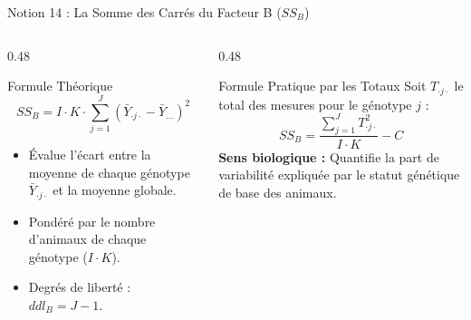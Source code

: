 \documentclass[aspectratio=169,10pt]{beamer}
\begin{document}
\begin{frame}{Notion 14 : La Somme des Carrés du Facteur B ($SS_B$)}
  \begin{columns}[onlytextwidth, T]
    \begin{column}{0.48\linewidth}
      \begin{conceptbox}{Formule Théorique}
        \begin{equation*}
          SS_B = I \cdot K \cdot \sum_{j=1}^J (\bar{Y}_{\cdot j\cdot} - \bar{Y}_{\dots})^2
        \end{equation*}
        \begin{itemize}
          \item Évalue l'écart entre la moyenne de chaque génotype $\bar{Y}_{\cdot j\cdot}$ et la moyenne globale.
          \item Pondéré par le nombre d'animaux de chaque génotype ($I \cdot K$).
          \item Degrés de liberté : $ddl_B = J - 1$.
        \end{itemize}
      \end{conceptbox}
    \end{column}
    \begin{column}{0.48\linewidth}
      \begin{takeawaybox}{Formule Pratique par les Totaux}
        Soit $T_{\cdot j\cdot}$ le total des mesures pour le génotype $j$ :
        \begin{equation*}
          SS_B = \frac{\sum_{j=1}^J T_{\cdot j\cdot}^2}{I \cdot K} - C
        \end{equation*}
        \textbf{Sens biologique :} Quantifie la part de variabilité expliquée par le statut génétique de base des animaux.
      \end{takeawaybox}
    \end{column}
  \end{columns}
\end{frame}
\end{document}

